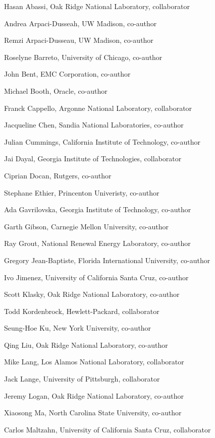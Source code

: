   \item Hasan Abassi, Oak Ridge National Laboratory, collaborator
  \item Andrea Arpaci-Dusseah, UW Madison, co-author
  \item Remzi Arpaci-Dusseau, UW Madison, co-author
  \item Roselyne Barreto, University of Chicago, co-author
  \item John Bent, EMC Corporation, co-author
  \item Michael Booth, Oracle, co-author
  \item Franck Cappello, Argonne National Laboratory, collaborator
  \item Jacqueline Chen, Sandia National Laboratories, co-author
  \item Julian Cummings, California Institute of Technology, co-author
  \item Jai Dayal, Georgia Institute of Technologies, collaborator
  \item Ciprian Docan, Rutgers, co-author
  \item Stephane Ethier, Princenton Univeristy, co-author
  \item Ada Gavrilovska, Georgia Institute of Technology, co-author
  \item Garth Gibson, Carnegie Mellon University, co-author
  \item Ray Grout, National Renewal Energy Laboratory, co-author
  \item Gregory Jean-Baptiste, Florida International University, co-author
  \item Ivo Jimenez, University of California Santa Cruz, co-author
  \item Scott Klasky, Oak Ridge National Laboratory, co-author
  \item Todd Kordenbrock, Hewlett-Packard, collaborator
  \item Seung-Hoe Ku, New York University, co-author
  \item Qing Liu, Oak Ridge National Laboratory, co-author
  \item Mike Lang, Los Alamos National Laboratory, collaborator
  \item Jack Lange, University of Pittsburgh, collaborator
  \item Jeremy Logan, Oak Ridge National Laboratory, co-author
  \item Xiaosong Ma, North Carolina State University, co-author
  \item Carlos Maltzahn, University of California Santa Cruz, collaborator
